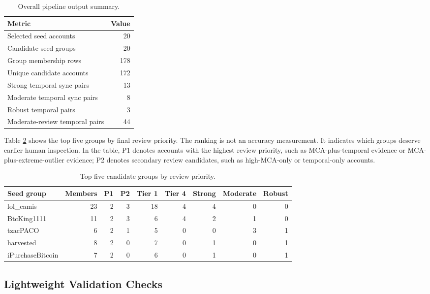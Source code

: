 \documentclass[conference]{IEEEtran}
\begin{document}
\begin{table}[htbp]
\centering
\caption{Overall pipeline output summary.}
\label{tab:overall}
\small
\begin{tabular}{lr}
\toprule
Metric & Value \\
\midrule
Selected seed accounts & 20 \\
Candidate seed groups & 20 \\
Group membership rows & 178 \\
Unique candidate accounts & 172 \\
Strong temporal sync pairs & 13 \\
Moderate temporal sync pairs & 8 \\
Robust temporal pairs & 3 \\
Moderate-review temporal pairs & 44 \\
\bottomrule
\end{tabular}
\end{table}

Table \ref{tab:topgroups} shows the top five groups by final review priority.
The ranking is not an accuracy measurement. It indicates which groups deserve
earlier human inspection. In the table, P1 denotes accounts with the highest
review priority, such as MCA-plus-temporal evidence or MCA-plus-extreme-outlier
evidence; P2 denotes secondary review candidates, such as high-MCA-only or
temporal-only accounts.

\begin{table}[htbp]
\centering
\caption{Top five candidate groups by review priority.}
\label{tab:topgroups}
\small
\begin{tabular}{lrrrrrrrr}
\toprule
Seed group & Members & P1 & P2 & Tier 1 & Tier 4 & Strong & Moderate & Robust \\
\midrule
lol\_camis & 23 & 2 & 3 & 18 & 4 & 4 & 0 & 0 \\
BtcKing1111 & 11 & 2 & 3 & 6 & 4 & 2 & 1 & 0 \\
tzacPACO & 6 & 2 & 1 & 5 & 0 & 0 & 3 & 1 \\
harvested & 8 & 2 & 0 & 7 & 0 & 1 & 0 & 1 \\
iPurchaseBitcoin & 7 & 2 & 0 & 6 & 0 & 1 & 0 & 1 \\
\bottomrule
\end{tabular}
\end{table}

\subsection{Lightweight Validation Checks}
\end{document}
